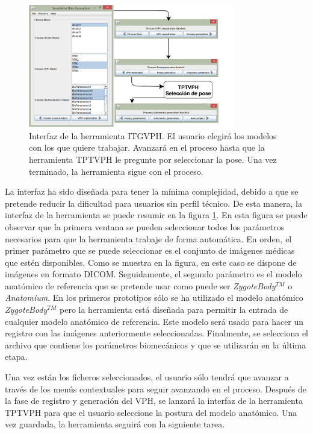 \begin{figure}[h]
    \centering
    \includegraphics[width=0.8\textwidth]{IMG/toolkitui.png}
    \caption{Interfaz de la herramienta \ac{ITGVPH}. El usuario elegirá los modelos con los que quiere trabajar. Avanzará en el proceso hasta que la herramienta TPTVPH le pregunte por seleccionar la pose. Una vez terminado, la herramienta sigue con el proceso.}
    \label{fig:toolui}
\end{figure}


La interfaz ha sido diseñada para tener la mínima complejidad, debido a que se pretende reducir la dificultad para usuarios sin perfil técnico. De esta manera, la interfaz de la herramienta se puede resumir en la figura \ref{fig:toolui}. En esta figura se puede observar que la primera ventana se pueden seleccionar todos los parámetros necesarios para que la herramienta trabaje de forma automática.
En orden, el primer parámetro que se puede seleccionar es el conjunto de imágenes médicas que estén disponibles. Como se muestra en la figura, en este caso se dispone de imágenes en formato \acs{DICOM}.
Seguidamente, el segundo parámetro es el modelo anatómico de referencia que se pretende usar como puede ser \emph{ZygoteBody}$^{TM}$ o \emph{Anatomium}. En los primeros prototipos sólo se ha utilizado el modelo anatómico \emph{ZygoteBody}$^{TM}$ pero la herramienta está diseñada para permitir la entrada de cualquier modelo anatómico de referencia. Este modelo será usado para hacer un registro con las imágenes anteriormente seleccionadas. 
Finalmente, se selecciona el archivo que contiene los parámetros biomecánicos y que se utilizarán en la última etapa.



Una vez están los ficheros seleccionados, el usuario sólo tendrá que avanzar a través de los menús contextuales para seguir avanzando en el proceso. Después de la fase de registro y generación del \ac{VPH}, se lanzará la interfaz de la herramienta \ac{TPTVPH} para que el usuario seleccione la postura del modelo anatómico. Una vez guardada, la herramienta seguirá con la siguiente tarea.


